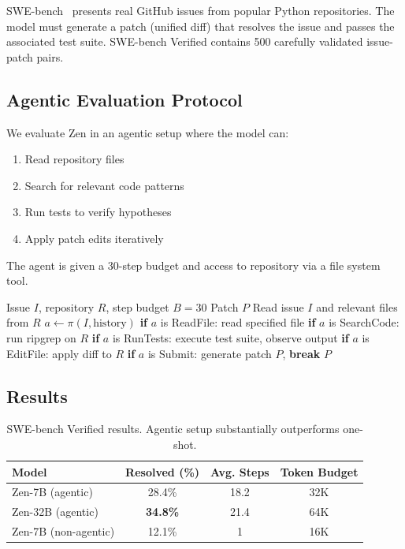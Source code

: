 \documentclass[11pt,a4paper]{article}
\begin{document}
SWE-bench~\cite{jimenez2024swebench} presents real GitHub issues from popular Python
repositories. The model must generate a patch (unified diff) that resolves the issue
and passes the associated test suite. SWE-bench Verified contains 500 carefully
validated issue-patch pairs.

\subsection{Agentic Evaluation Protocol}

We evaluate Zen in an agentic setup where the model can:
\begin{enumerate}
  \item Read repository files
  \item Search for relevant code patterns
  \item Run tests to verify hypotheses
  \item Apply patch edits iteratively
\end{enumerate}

The agent is given a 30-step budget and access to repository via a file system tool.

\begin{algorithm}[H]
\caption{SWE-bench Agentic Resolution}
\begin{algorithmic}[1]
\REQUIRE Issue $I$, repository $R$, step budget $B=30$
\ENSURE Patch $P$
\STATE Read issue $I$ and relevant files from $R$
  \STATE $a \leftarrow \pi(I, \text{history})$ 
  \STATE \textbf{if} $a$ is ReadFile: read specified file
  \STATE \textbf{if} $a$ is SearchCode: run ripgrep on $R$
  \STATE \textbf{if} $a$ is RunTests: execute test suite, observe output
  \STATE \textbf{if} $a$ is EditFile: apply diff to $R$
  \STATE \textbf{if} $a$ is Submit: generate patch $P$, \textbf{break}
\ENDFOR
\RETURN $P$
\end{algorithmic}
\end{algorithm}

\subsection{Results}

\begin{table}[H]
\centering
\begin{tabular}{lccc}
\toprule
\textbf{Model} & \textbf{Resolved (\%)} & \textbf{Avg. Steps} & \textbf{Token Budget} \\
\midrule
Zen-7B (agentic) & 28.4\% & 18.2 & 32K \\
Zen-32B (agentic) & \textbf{34.8\%} & 21.4 & 64K \\
Zen-7B (non-agentic) & 12.1\% & 1 & 16K \\
\bottomrule
\end{tabular}
\caption{SWE-bench Verified results. Agentic setup substantially outperforms one-shot.}
\end{table}
\end{document}
